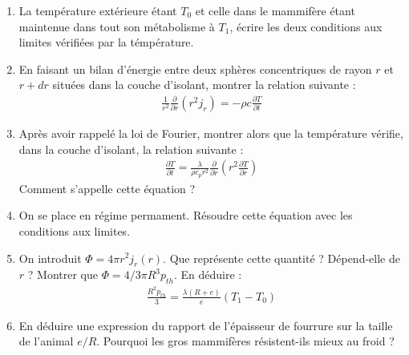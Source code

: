 \begin{enumerate}

	\item La température extérieure étant $T_{0}$ et celle dans le mammifère étant maintenue dans tout son métabolisme à $T_1$, écrire les deux conditions aux limites vérifiées par la témpérature.
	
	\item En faisant un bilan d'énergie entre deux sphères concentriques de rayon $r$ et $r+dr$ situées dans la couche d'isolant, montrer la relation suivante :
	\begin{align*}
		\frac{1}{r^2}\frac{\partial }{\partial r}\left( r^2j_r\right) =-\rho c\frac{\partial T}{\partial t}
	\end{align*}
	
	\item Après avoir rappelé la loi de Fourier, montrer alors que la température vérifie, dans la couche d'isolant, la relation suivante :
	\begin{align*}
		\frac{\partial T}{\partial t}=\frac{\lambda}{\rho c_p r^2}\frac{\partial }{\partial r}\left( r^2\frac{\partial T}{\partial r}\right) 	
	\end{align*}
	Comment s'appelle cette équation ?

	\item On se place en régime permament. Résoudre cette équation avec les conditions aux limites.
	
	\item On introduit $\Phi=4\pi r^2j_r(r)$. Que représente cette quantité ? Dépend-elle de $r$ ? Montrer que $\Phi=4/3\pi R^3p_{th}$. En déduire :
	\begin{align*}
		\frac{R^2p_{th}}{3}=\frac{\lambda (R+e)}{e}(T_1-T_0)
	\end{align*}
	
	\item En déduire une expression du rapport de l'épaisseur de fourrure sur la taille de l'animal $e/R$. Pourquoi les gros mammifères résistent-ils mieux au froid ?

\end{enumerate}

\newpage

